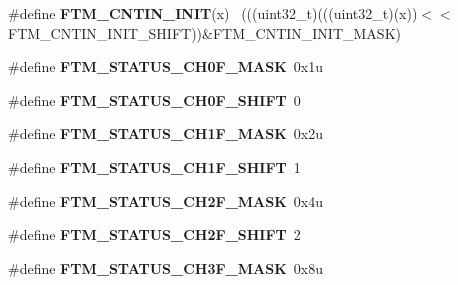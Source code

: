 \begin{DoxyCompactItemize}
\item 
\hypertarget{group___f_t_m___register___masks_gafebcdb424cb22b2bd2a8c641cac23ab7}{}\#define {\bfseries F\+T\+M\+\_\+\+C\+N\+T\+I\+N\+\_\+\+I\+N\+I\+T}(x)                                            ~(((uint32\+\_\+t)(((uint32\+\_\+t)(x))$<$$<$F\+T\+M\+\_\+\+C\+N\+T\+I\+N\+\_\+\+I\+N\+I\+T\+\_\+\+S\+H\+I\+F\+T))\&F\+T\+M\+\_\+\+C\+N\+T\+I\+N\+\_\+\+I\+N\+I\+T\+\_\+\+M\+A\+S\+K)\label{group___f_t_m___register___masks_gafebcdb424cb22b2bd2a8c641cac23ab7}

\item 
\hypertarget{group___f_t_m___register___masks_ga9ba703f87542e033b6c311c061ea9187}{}\#define {\bfseries F\+T\+M\+\_\+\+S\+T\+A\+T\+U\+S\+\_\+\+C\+H0\+F\+\_\+\+M\+A\+S\+K}~0x1u\label{group___f_t_m___register___masks_ga9ba703f87542e033b6c311c061ea9187}

\item 
\hypertarget{group___f_t_m___register___masks_ga4ea6740087a54ad02b40e7cf909f92aa}{}\#define {\bfseries F\+T\+M\+\_\+\+S\+T\+A\+T\+U\+S\+\_\+\+C\+H0\+F\+\_\+\+S\+H\+I\+F\+T}~0\label{group___f_t_m___register___masks_ga4ea6740087a54ad02b40e7cf909f92aa}

\item 
\hypertarget{group___f_t_m___register___masks_gaf99cd78b57a27e6aa5fea6b587dc4e5f}{}\#define {\bfseries F\+T\+M\+\_\+\+S\+T\+A\+T\+U\+S\+\_\+\+C\+H1\+F\+\_\+\+M\+A\+S\+K}~0x2u\label{group___f_t_m___register___masks_gaf99cd78b57a27e6aa5fea6b587dc4e5f}

\item 
\hypertarget{group___f_t_m___register___masks_gaae55718a94e09af32a6596131a1b7e45}{}\#define {\bfseries F\+T\+M\+\_\+\+S\+T\+A\+T\+U\+S\+\_\+\+C\+H1\+F\+\_\+\+S\+H\+I\+F\+T}~1\label{group___f_t_m___register___masks_gaae55718a94e09af32a6596131a1b7e45}

\item 
\hypertarget{group___f_t_m___register___masks_gab75f4d4d1939e42385d1feb59b1eb363}{}\#define {\bfseries F\+T\+M\+\_\+\+S\+T\+A\+T\+U\+S\+\_\+\+C\+H2\+F\+\_\+\+M\+A\+S\+K}~0x4u\label{group___f_t_m___register___masks_gab75f4d4d1939e42385d1feb59b1eb363}

\item 
\hypertarget{group___f_t_m___register___masks_ga94df65cce2bfdcf540b7870192e1e5ae}{}\#define {\bfseries F\+T\+M\+\_\+\+S\+T\+A\+T\+U\+S\+\_\+\+C\+H2\+F\+\_\+\+S\+H\+I\+F\+T}~2\label{group___f_t_m___register___masks_ga94df65cce2bfdcf540b7870192e1e5ae}

\item 
\hypertarget{group___f_t_m___register___masks_ga01848bca7d5009780d57fb7ecdbdc70f}{}\#define {\bfseries F\+T\+M\+\_\+\+S\+T\+A\+T\+U\+S\+\_\+\+C\+H3\+F\+\_\+\+M\+A\+S\+K}~0x8u\label{group___f_t_m___register___masks_ga01848bca7d5009780d57fb7ecdbdc70f}


\end{DoxyCompactItemize}
